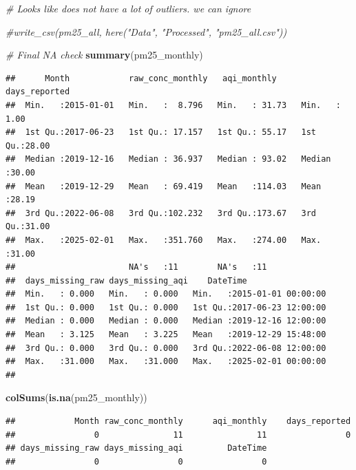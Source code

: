 \documentclass[
]{article}
\newenvironment{Shaded}{\begin{snugshade}}{\end{snugshade}}
\newcommand{\CommentTok}[1]{\textcolor[rgb]{0.56,0.35,0.01}{\textit{#1}}}
\newcommand{\FunctionTok}[1]{\textcolor[rgb]{0.13,0.29,0.53}{\textbf{#1}}}
\newcommand{\NormalTok}[1]{#1}
\begin{document}
\begin{Shaded}
\begin{Highlighting}[]
\CommentTok{\# Looks like does not have a lot of outliers. we can ignore}


\CommentTok{\#write\_csv(pm25\_all, here("Data", "Processed", "pm25\_all.csv"))}



\CommentTok{\# Final NA check}
\FunctionTok{summary}\NormalTok{(pm25\_monthly)}
\end{Highlighting}
\end{Shaded}

\begin{verbatim}
##      Month            raw_conc_monthly   aqi_monthly     days_reported  
##  Min.   :2015-01-01   Min.   :  8.796   Min.   : 31.73   Min.   : 1.00  
##  1st Qu.:2017-06-23   1st Qu.: 17.157   1st Qu.: 55.17   1st Qu.:28.00  
##  Median :2019-12-16   Median : 36.937   Median : 93.02   Median :30.00  
##  Mean   :2019-12-29   Mean   : 69.419   Mean   :114.03   Mean   :28.19  
##  3rd Qu.:2022-06-08   3rd Qu.:102.232   3rd Qu.:173.67   3rd Qu.:31.00  
##  Max.   :2025-02-01   Max.   :351.760   Max.   :274.00   Max.   :31.00  
##                       NA's   :11        NA's   :11                      
##  days_missing_raw days_missing_aqi    DateTime                  
##  Min.   : 0.000   Min.   : 0.000   Min.   :2015-01-01 00:00:00  
##  1st Qu.: 0.000   1st Qu.: 0.000   1st Qu.:2017-06-23 12:00:00  
##  Median : 0.000   Median : 0.000   Median :2019-12-16 12:00:00  
##  Mean   : 3.125   Mean   : 3.225   Mean   :2019-12-29 15:48:00  
##  3rd Qu.: 0.000   3rd Qu.: 0.000   3rd Qu.:2022-06-08 12:00:00  
##  Max.   :31.000   Max.   :31.000   Max.   :2025-02-01 00:00:00  
## 
\end{verbatim}

\begin{Shaded}
\begin{Highlighting}[]
\FunctionTok{colSums}\NormalTok{(}\FunctionTok{is.na}\NormalTok{(pm25\_monthly))}
\end{Highlighting}
\end{Shaded}

\begin{verbatim}
##            Month raw_conc_monthly      aqi_monthly    days_reported 
##                0               11               11                0 
## days_missing_raw days_missing_aqi         DateTime 
##                0                0                0
\end{verbatim}
\end{document}
